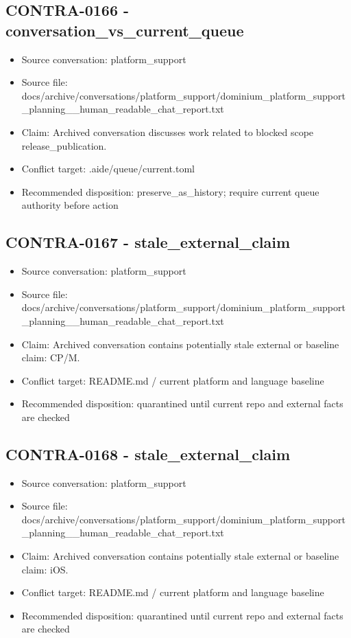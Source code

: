 \documentclass[11pt,a4paper]{report}
\begin{document}
\subsection{CONTRA-0166 - conversation\_vs\_current\_queue}

\begin{itemize}
\item Source conversation: platform\_support
\item Source file: docs/archive/conversations/platform\_support/dominium\_platform\_support\_planning\_\_human\_readable\_chat\_report.txt
\item Claim: Archived conversation discusses work related to blocked scope release\_publication.
\item Conflict target: .aide/queue/current.toml
\item Recommended disposition: preserve\_as\_history; require current queue authority before action
\end{itemize}

\subsection{CONTRA-0167 - stale\_external\_claim}

\begin{itemize}
\item Source conversation: platform\_support
\item Source file: docs/archive/conversations/platform\_support/dominium\_platform\_support\_planning\_\_human\_readable\_chat\_report.txt
\item Claim: Archived conversation contains potentially stale external or baseline claim: CP/M.
\item Conflict target: README.md / current platform and language baseline
\item Recommended disposition: quarantined until current repo and external facts are checked
\end{itemize}

\subsection{CONTRA-0168 - stale\_external\_claim}

\begin{itemize}
\item Source conversation: platform\_support
\item Source file: docs/archive/conversations/platform\_support/dominium\_platform\_support\_planning\_\_human\_readable\_chat\_report.txt
\item Claim: Archived conversation contains potentially stale external or baseline claim: iOS.
\item Conflict target: README.md / current platform and language baseline
\item Recommended disposition: quarantined until current repo and external facts are checked
\end{itemize}
\end{document}
